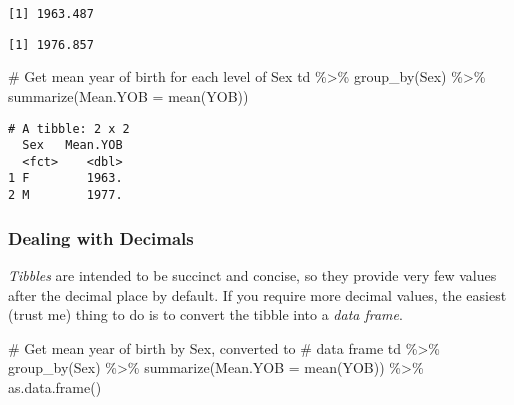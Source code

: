 \documentclass[
  12pt,
  letterpaper]{article}
\newenvironment{Shaded}{\begin{snugshade}}{\end{snugshade}}
\newcommand{\AttributeTok}[1]{\textcolor[rgb]{0.40,0.45,0.13}{#1}}
\newcommand{\CommentTok}[1]{\textcolor[rgb]{0.37,0.37,0.37}{#1}}
\newcommand{\FunctionTok}[1]{\textcolor[rgb]{0.28,0.35,0.67}{#1}}
\newcommand{\NormalTok}[1]{\textcolor[rgb]{0.00,0.23,0.31}{#1}}
\newcommand{\SpecialCharTok}[1]{\textcolor[rgb]{0.37,0.37,0.37}{#1}}
\newcommand{\StringTok}[1]{\textcolor[rgb]{0.13,0.47,0.30}{#1}}
\begin{document}
\begin{verbatim}
[1] 1963.487
\end{verbatim}

\begin{Shaded}
\end{Shaded}

\begin{verbatim}
[1] 1976.857
\end{verbatim}

\begin{Shaded}
\begin{Highlighting}[]
\CommentTok{\# Get mean year of birth for each level of Sex}
\NormalTok{td }\SpecialCharTok{\%\textgreater{}\%}
    \FunctionTok{group\_by}\NormalTok{(Sex) }\SpecialCharTok{\%\textgreater{}\%}
    \FunctionTok{summarize}\NormalTok{(}\AttributeTok{Mean.YOB =} \FunctionTok{mean}\NormalTok{(YOB))}
\end{Highlighting}
\end{Shaded}

\begin{verbatim}
# A tibble: 2 x 2
  Sex   Mean.YOB
  <fct>    <dbl>
1 F        1963.
2 M        1977.
\end{verbatim}

\hypertarget{dealing-with-decimals}{%
\subsubsection{Dealing with Decimals}\label{dealing-with-decimals}}

\emph{Tibbles} are intended to be succinct and concise, so they provide
very few values after the decimal place by default. If you require more
decimal values, the easiest (trust me) thing to do is to convert the
tibble into a \emph{data frame}.

\begin{Shaded}
\begin{Highlighting}[]
\CommentTok{\# Get mean year of birth by Sex, converted to}
\CommentTok{\# data frame}
\NormalTok{td }\SpecialCharTok{\%\textgreater{}\%}
    \FunctionTok{group\_by}\NormalTok{(Sex) }\SpecialCharTok{\%\textgreater{}\%}
    \FunctionTok{summarize}\NormalTok{(}\AttributeTok{Mean.YOB =} \FunctionTok{mean}\NormalTok{(YOB)) }\SpecialCharTok{\%\textgreater{}\%}
    \FunctionTok{as.data.frame}\NormalTok{()}
\end{Highlighting}
\end{Shaded}
\end{document}
